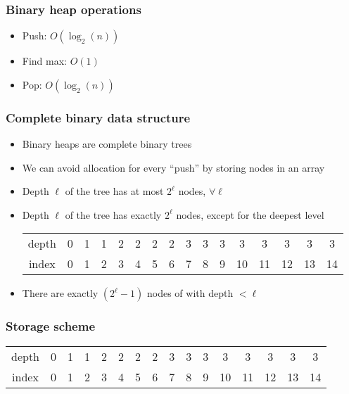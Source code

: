 \documentclass[12pt]{article}
\begin{document}
\subsubsection{Binary heap operations}
\begin{itemize}
    \item Push: \(O(\log_2(n))\)
    \item Find max: \(O(1)\)
    \item Pop: \(O(\log_2(n))\)
\end{itemize}

\subsubsection{Complete binary data structure}
\begin{itemize}
    \item Binary heaps are complete binary trees
    \item We can avoid allocation for every ``push'' by storing nodes in an array
    \item Depth \(\ell\) of the tree has at most \(2^\ell\) nodes, \(\forall \ell\)
    \item Depth \(\ell\) of the tree has exactly \(2^\ell\) nodes, except for the deepest level
    \begin{center}
        \begin{tabular}{|c|ccccccccccccccc|}
        \hline
        depth & 0 & 1 & 1 & 2 & 2 & 2 & 2 & 3 & 3 & 3 & 3 & 3 & 3 & 3 & 3\\
        index & 0 & 1 & 2 & 3 & 4 & 5 & 6 & 7 & 8 & 9 & 10 & 11 & 12 & 13 & 14 \\
        \hline
        \end{tabular}
    \end{center}
    \item There are exactly \( (2^\ell - 1) \) nodes of with depth \( < \ell \)
\end{itemize}



\subsubsection{Storage scheme}

    \begin{center}
        \begin{tabular}{|c|ccccccccccccccc|}
        \hline
        depth & 0 & 1 & 1 & 2 & 2 & 2 & 2 & 3 & 3 & 3 & 3 & 3 & 3 & 3 & 3\\
        index & 0 & 1 & 2 & 3 & 4 & 5 & 6 & 7 & 8 & 9 & 10 & 11 & 12 & 13 & 14 \\
        \hline
        \end{tabular}
    \end{center}
\end{document}
